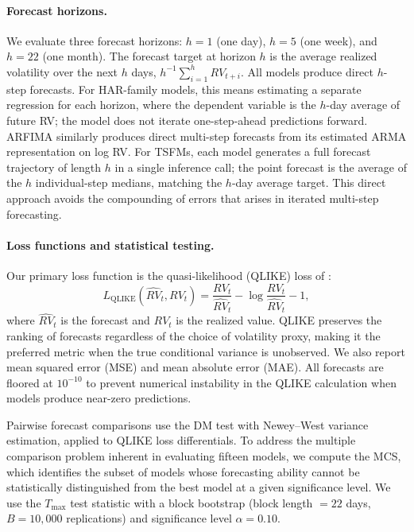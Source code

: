 \documentclass[12pt]{article}
\begin{document}
\paragraph{Forecast horizons.}
We evaluate three forecast horizons: $h = 1$ (one day), $h = 5$ (one week), and $h = 22$ (one month). The forecast target at horizon $h$ is the average realized volatility over the next $h$ days, $h^{-1}\sum_{i=1}^{h} RV_{t+i}$. All models produce direct $h$-step forecasts. For HAR-family models, this means estimating a separate regression for each horizon, where the dependent variable is the $h$-day average of future RV; the model does not iterate one-step-ahead predictions forward. ARFIMA similarly produces direct multi-step forecasts from its estimated ARMA representation on log RV. For TSFMs, each model generates a full forecast trajectory of length $h$ in a single inference call; the point forecast is the average of the $h$ individual-step medians, matching the $h$-day average target. This direct approach avoids the compounding of errors that arises in iterated multi-step forecasting.

\paragraph{Loss functions and statistical testing.}
Our primary loss function is the quasi-likelihood (QLIKE) loss of \citet{patton2011}:
\begin{equation}
  L_{\text{QLIKE}}(\widehat{RV}_t, RV_t) = \frac{RV_t}{\widehat{RV}_t} - \log\frac{RV_t}{\widehat{RV}_t} - 1,
  \label{eq:qlike}
\end{equation}
where $\widehat{RV}_t$ is the forecast and $RV_t$ is the realized value. QLIKE preserves the ranking of forecasts regardless of the choice of volatility proxy, making it the preferred metric when the true conditional variance is unobserved. We also report mean squared error (MSE) and mean absolute error (MAE). All forecasts are floored at $10^{-10}$ to prevent numerical instability in the QLIKE calculation when models produce near-zero predictions.

Pairwise forecast comparisons use the DM test with Newey--West variance estimation, applied to QLIKE loss differentials. To address the multiple comparison problem inherent in evaluating fifteen models, we compute the MCS, which identifies the subset of models whose forecasting ability cannot be statistically distinguished from the best model at a given significance level. We use the $T_{\max}$ test statistic with a block bootstrap (block length $= 22$ days, $B = 10{,}000$ replications) and significance level $\alpha = 0.10$.
\end{document}

